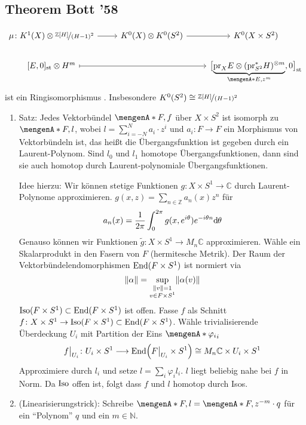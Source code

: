 \subsection*{Theorem Bott '58}
\[
	\begin{tikzcd}
		\mu \colon K^1(X) \otimes \nicefrac{\mathds{Z}[H]}{(H-1)^2} \rar & K^0(X) \otimes  K^0(S^2) \rar & K^0(X \times S^2) \\
		\benbrace{E,0}_\st \otimes H^m \ar[rr,mapsto] & & \benbrace[\big]{\Underbrace{\pr_X E \otimes (\pr_{S^2}^* H)^{\otimes m}}{\set{E,z^m} },0}_\st
	\end{tikzcd}
\]
ist ein Ringisomorphismus . Insbesondere $K^0(S^2) \cong \nicefrac{\mathds{Z}[H]}{(H-1)^2}$
\begin{enumerate}[1.]
	\item Satz: Jedes Vektorbündel $\set{F,f}$ über $X \times S^2$ ist isomorph zu $\set{F,l}$, wobei $l= \sum_{i=-N}^{N} a_i \cdot z^i$ und $a_i \colon F \to F$ ein 
	Morphismus von Vektorbündeln ist, das heißt die Übergangsfunktion ist gegeben durch ein Laurent-Polynom. Sind $l_0$ und $l_1$ homotope Übergangsfunktionen, dann sind sie 
	auch homotop durch Laurent-polynomiale Übergangsfunktionen.
	
	Idee hierzu: Wir können stetige Funktionen $g \colon X \times S^1 \to \mathds{C}$ durch Laurent-Polynome approximieren. 
	\(
		g(x,z) = \sum_{n \in \mathds{Z}} a_n(x) z^n
	\)
	für 
	\[
		a_n(x) = \frac{1}{2 \pi } \int_0^{2 \pi} g(x, e^{i \theta}) e^{- i \theta n} \mathd \theta 
	\]
	Genauso können wir Funktionen $\tilde{g} \colon X \times S^1 \to M_n \mathds{C}$ approximieren. Wähle ein Skalarprodukt in den Fasern von $F$ (hermitesche Metrik).
	Der Raum der Vektorbündelendomorphismen $\END(F \times S^1)$ ist normiert via
	\[
		\norm{\alpha} = \sup_{\substack{\norm{v}=1 \\ v \in F \times S^1 }} \norm{\alpha(v)} 
	\]
	$\Iso(F \times S^1) \subset \END(F \times S^1)$ ist offen. Fasse $f$ als Schnitt $f \colon X \times S^1 \to \Iso(F \times S^1) \subset \End(F \times S^1)$. Wähle 
	trivialisierende Überdeckung $U_i$ mit Partition der Eins $\set{\varphi_i}_i$
	\[
		f \big|_{U_i} \colon U_i \times S^1 \longrightarrow \End \enbrace*{F\big|_{U_i} \times S^1} \cong M_n \mathds{C} \times U_i \times S^1 
	\]
	Approximiere durch $l_i$ und setze $l= \sum_{i} \varphi_i l_i$. $l$ liegt beliebig nahe bei $f$ in Norm. Da $\Iso$ offen ist, folgt dass $f$ und $l$ homotop durch
	Isos. \bewende
	\item (Linearisierungstrick): Schreibe $\set{F,l}= \set{F, z^{-m} \cdot q}$ für ein \enquote{Polynom} $q$ und ein $m \in \mathds{N}$.
	

\end{enumerate}
